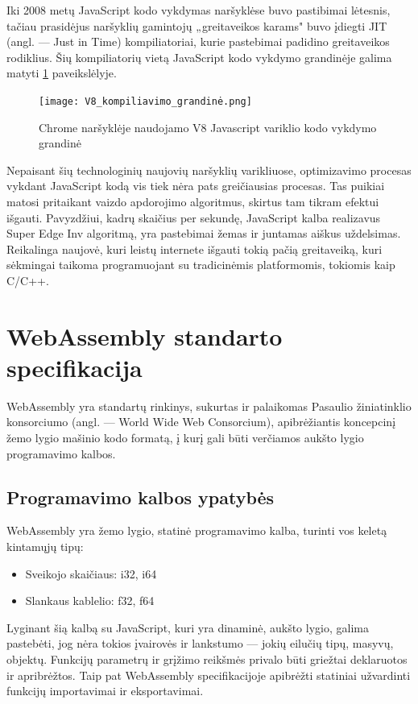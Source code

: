 \documentclass{VUMIFPSkursinis}
\begin{document}
Iki 2008 metų JavaScript kodo vykdymas naršyklėse buvo pastibimai lėtesnis, tačiau prasidėjus naršyklių gamintojų „greitaveikos karams" buvo įdiegti JIT (angl. — Just in Time) kompiliatoriai, kurie pastebimai padidino greitaveikos rodiklius. \cite{DAC17} Šių kompiliatorių vietą JavaScript kodo vykdymo grandinėje galima matyti \ref{fig:v8_pipeline} paveikslėlyje.

\begin{figure}[h!]
  \begin{center}
  \texttt{[image: V8\_kompiliavimo\_grandinė.png]}
  \end{center}
  \caption{Chrome naršyklėje naudojamo V8 Javascript variklio kodo vykdymo grandinė \cite{HNO19}}
  \label{fig:v8_pipeline}
\end{figure}

Nepaisant šių technologinių naujovių naršyklių varikliuose, optimizavimo procesas vykdant JavaScript kodą vis tiek nėra pats greičiausias procesas. Tas puikiai matosi pritaikant vaizdo apdorojimo algoritmus, skirtus tam tikram efektui išgauti. Pavyzdžiui, kadrų skaičius per sekundę, JavaScript kalba realizavus Super Edge Inv algoritmą, yra pastebimai žemas ir juntamas aiškus uždelsimas. \cite{WVE17} Reikalinga naujovė, kuri leistų internete išgauti tokią pačią greitaveiką, kuri sėkmingai taikoma programuojant su tradicinėmis platformomis, tokiomis kaip C/C++.

\section{WebAssembly standarto specifikacija}

WebAssembly yra standartų rinkinys, sukurtas ir palaikomas Pasaulio žiniatinklio konsorciumo (angl. — World Wide Web Consorcium), apibrėžiantis koncepcinį žemo lygio mašinio kodo formatą, į kurį gali būti verčiamos aukšto lygio programavimo kalbos. \cite{WAS17}

\subsection{Programavimo kalbos ypatybės}
WebAssembly yra žemo lygio, statinė programavimo kalba, turinti vos keletą kintamųjų tipų:

\begin{itemize}
    \item Sveikojo skaičiaus: i32, i64
    \item Slankaus kablelio: f32, f64
\end{itemize}
Lyginant šią kalbą su JavaScript, kuri yra dinaminė, aukšto lygio, galima pastebėti, jog nėra tokios įvairovės ir lankstumo — jokių eilučių tipų, masyvų, objektų. Funkcijų parametrų ir grįžimo reikšmės privalo būti griežtai deklaruotos ir apribrėžtos. Taip pat WebAssembly specifikacijoje apibrėžti statiniai užvardinti funkcijų importavimai ir eksportavimai.
\end{document}
